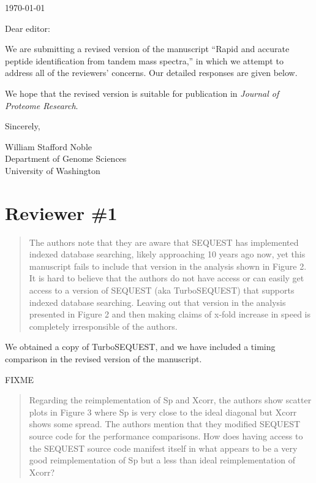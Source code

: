 \documentclass{article}
\newcommand{\breview}{\begin{quotation}\begin{em}\noindent}
\newcommand{\ereview}{\end{em}\end{quotation}}
\begin{document}
\hspace*{3.0in}\today

\vspace*{3ex}

\noindent
Dear editor:

\vspace*{1ex}

We are submitting a revised version of the manuscript ``Rapid and
accurate peptide identification from tandem mass spectra,'' in which
we attempt to address all of the reviewers' concerns.  Our detailed
responses are given below.

We hope that the revised version is suitable for publication in {\em
Journal of Proteome Research}.

\vspace*{1ex}

\noindent
Sincerely,

\hspace*{1ex}

\noindent
William Stafford Noble\\
Department of Genome Sciences\\
University of Washington


\section*{Reviewer \#1}

\breview The authors note that they are aware that SEQUEST has
implemented indexed database searching, likely approaching 10 years
ago now, yet this manuscript fails to include that version in the
analysis shown in Figure 2.  It is hard to believe that the authors do
not have access or can easily get access to a version of SEQUEST (aka
TurboSEQUEST) that supports indexed database searching.  Leaving out
that version in the analysis presented in Figure 2 and then making
claims of x-fold increase in speed is completely irresponsible of the
authors. \ereview

We obtained a copy of TurboSEQUEST, and we have included a timing
comparison in the revised version of the manuscript.

FIXME

\breview Regarding the reimplementation of Sp and Xcorr, the authors
show scatter plots in Figure 3 where Sp is very close to the ideal
diagonal but Xcorr shows some spread.  The authors mention that they
modified SEQUEST source code for the performance comparisons.  How
does having access to the SEQUEST source code manifest itself in what
appears to be a very good reimplementation of Sp but a less than ideal
reimplementation of Xcorr? \ereview
\end{document}
